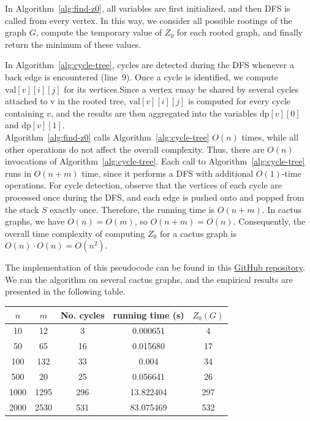 \documentclass[11pt]{article}
\theoremstyle{plain}
\theoremstyle{definition}
\theoremstyle{remark}
\begin{document}
In Algorithm~\ref{alg:find-z0}, all variables are first initialized, and then DFS is called from every vertex. In this way, we consider all possible rootings of the graph $G$, compute the temporary value of $Z_0$ for each rooted graph, and finally return the minimum of these values.

In Algorithm~\ref{alg:cycle-tree}, cycles are detected during the DFS whenever a back edge is encountered (line~9). Once a cycle is identified, we compute $\text{val}[v][i][j]$ for its vertices.Since a vertex $v$may be shared by several cycles attached to v in the rooted tree, $\text{val}[v][i][j]$ is computed for every cycle containing $v$, and the results are then aggregated into the variables $\text{dp}[v][0]$ and $\text{dp}[v][1]$.\\
Algorithm~\ref{alg:find-z0} calls Algorithm~\ref{alg:cycle-tree} $O(n)$ times, while all other operations do not affect the overall complexity. Thus, there are $O(n)$ invocations of Algorithm~\ref{alg:cycle-tree}. Each call to Algorithm~\ref{alg:cycle-tree} runs in $O(n+m)$ time, since it performs a DFS with additional $O(1)$-time operations. For cycle detection, observe that the vertices of each cycle are processed once during the DFS, and each edge is pushed onto and popped from the stack $S$ exactly once. Therefore, the running time is $O(n+m)$. In cactus graphs, we have $O(n) = O(m)$, so $O(n+m) = O(n)$. Consequently, the overall time complexity of computing $Z_0$ for a cactus graph is $O(n) \cdot O(n) = O(n^2)$.

The implementation of this pseudocode can be found in this \href{https://github.com/sanazmgh/Zq-Forcing-Number-Algorithms}{GitHub repository}. We ran the algorithm on several cactus graphs, and the empirical results are presented in the following table.

\begin{table}[H]
\centering
\begin{tabular}{|c c c c c |} 
 \hline
$n$ & $m$ & No. cycles & running time (s) & $Z_0(G)$ \\
\hline
    10   & 12   & 3    & 0.000651   & 4 \\
    50   & 65   & 16   & 0.015680 & 17\\
    100   & 132   & 33  & 0.004 & 34 \\
    500   & 20   & 25   & 0.056641   & 26 \\
    1000  & 1295   & 296   & 13.822404 & 297 \\
    2000 & 2530  & 531  & 83.075469 & 532 \\
\hline
\end{tabular}
\end{table}


\end{document}
